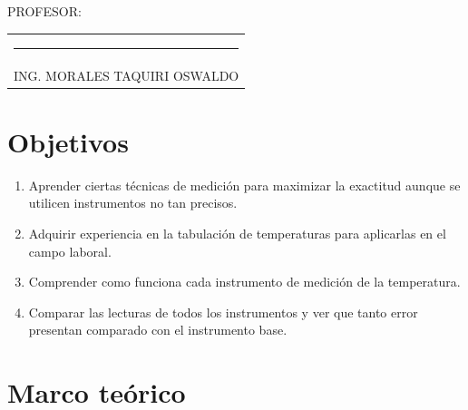 \documentclass[a4paper,11pt]{report}
\begin{document}
{\large PROFESOR:} \\[0.6cm]
\begin{center}
\begin{tabular}{c}
\rule[3pt]{4.8in}{1pt}\\[1pt]
ING. MORALES TAQUIRI OSWALDO
\end{tabular}
\end{center}
\vfill
\newpage
\tableofcontents
\newpage
{} %
\setcounter{page}{1}  %
\chapter{Objetivos}
\begin{enumerate}
\item Aprender ciertas técnicas de medición para maximizar la exactitud aunque se utilicen instrumentos no tan precisos.
\item Adquirir experiencia en la tabulación de temperaturas para aplicarlas en el campo laboral.
\item Comprender como funciona cada instrumento de medición de la temperatura.
\item Comparar las lecturas de todos los instrumentos y ver que tanto error presentan comparado con el instrumento base.
\end{enumerate}
\chapter{Marco teórico}
\end{document}
